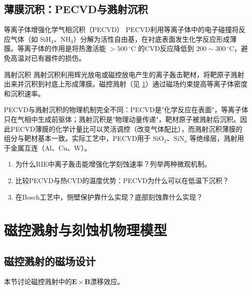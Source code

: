 \documentclass[12pt,a4paper,openany,oneside]{book}
\newcommand{\vect}[1]{\bm{#1}}
\begin{document}
\subsection{薄膜沉积：PECVD与溅射沉积}

\begin{definition}{等离子体增强化学气相沉积（PECVD）}{}{}
\label{def:pecvd}
PECVD利用等离子体中的电子碰撞将反应气体（如 $\mathrm{SiH}_4$、$\mathrm{NH}_3$）分解为活性自由基，在衬底表面发生化学反应形成薄膜。等离子体的作用是将热激活能 $> 500\,\mathrm{^\circ C}$ 的CVD反应降低到 $200\sim 300\,\mathrm{^\circ C}$，避免高温对已有器件的损伤。
\end{definition}

\begin{definition}{溅射沉积}{}{}
\label{def:sputter-deposition}
溅射沉积利用辉光放电或磁控放电产生的离子轰击靶材，将靶原子溅射出来并沉积到衬底上形成薄膜。磁控溅射（见 \cref{sec:magnetron-sputtering}）通过磁场约束提高等离子体密度和沉积速率。
\end{definition}

\begin{insight}{}{}
PECVD与溅射沉积的物理机制完全不同：PECVD是"化学反应在表面"，等离子体只在气相中生成前驱体；溅射沉积是"物理动量传递"，靶材原子被溅射后沉积。因此PECVD薄膜的化学计量比可以灵活调控（改变气体配比），而溅射沉积薄膜的组分与靶材基本一致。实际工艺中，PECVD用于 $\mathrm{SiO}_2$、$\mathrm{SiN}_x$ 等绝缘层，溅射用于金属互连（Al、Cu、W）。
\end{insight}

\begin{miniquiz}
\begin{enumerate}
\item 为什么RIE中离子轰击能增强化学刻蚀速率？列举两种微观机制。
\item 比较PECVD与热CVD的温度优势：PECVD为什么可以在低温下沉积？
\item 在Bosch工艺中，侧壁保护靠什么实现？底部刻蚀靠什么实现？
\end{enumerate}
\end{miniquiz}

\section{磁控溅射与刻蚀机物理模型}
\label{sec:magnetron-sputtering}

\subsection{磁控溅射的磁场设计}
本节讨论磁控溅射中的$\vect{E}\times\vect{B}$漂移效应。
\end{document}
